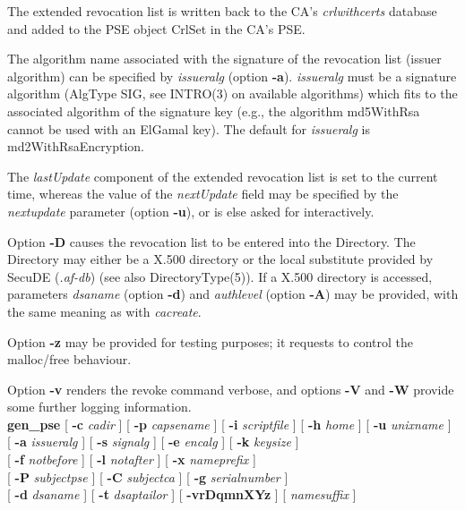 The extended revocation list is written back to the CA's {\em crlwithcerts} database and
added to the PSE object CrlSet in the CA's PSE.

The algorithm name associated with the signature of the revocation list 
(issuer algorithm) can be specified by {\em issueralg} 
(option {\bf -a}). {\em issueralg} must be a
signature algorithm (AlgType SIG, see INTRO(3) on available algorithms) which fits to the associated 
algorithm of the signature key (e.g., the algorithm md5WithRsa cannot be used with an ElGamal key).
The default for {\em issueralg} is md2WithRsaEncryption.

The {\em lastUpdate} component of the extended revocation list is set to the 
current time, whereas the value of the {\em nextUpdate} field may be specified by the {\em nextupdate} parameter (option {\bf -u}), or is else asked for interactively.
 
Option {\bf -D} causes the revocation list to be entered into the Directory.
The Directory may either be a X.500 directory or the local substitute provided by 
SecuDE ({\em .af-db}) (see also DirectoryType(5)).
If a X.500 directory is accessed, parameters {\em dsaname} (option {\bf -d}) and {\em authlevel} 
(option {\bf -A}) may be provided, with the same meaning as with {\em cacreate}.

Option {\bf -z} may be provided for testing purposes; it requests to control the malloc/free behaviour.

Option {\bf -v} renders the revoke command verbose, and options {\bf -V} and {\bf -W} provide 
some further logging information.
\\ [1em]
{\bf gen\_pse} [ {\bf -c} {\em cadir} ] [ {\bf -p} {\em capsename} ] [ {\bf -i} {\em scriptfile} ] [ {\bf -h} {\em 
home} ] [ {\bf -u} {\em unixname} ] \\ 
\hspace*{2cm} [ {\bf -a} {\em issueralg} ] [ {\bf -s} {\em signalg} ] [ {\bf -e} {\em encalg} ] [ {\bf -k} {\em 
keysize} ] \\ 
\hspace*{2cm} [ {\bf -f} {\em notbefore} ] [ {\bf -l} {\em notafter} ] [ {\bf -x} {\em nameprefix} ]  \\ 
\hspace*{2cm} [ {\bf -P} {\em subjectpse} ] [ {\bf -C} {\em subjectca} ] [ {\bf -g} {\em serialnumber} ] \\
\hspace*{2cm} [ {\bf -d} {\em dsaname} ] [ {\bf -t} {\em dsaptailor} ] [ {\bf -vrDqmnXYz} ] [ {\em namesuffix} ]

